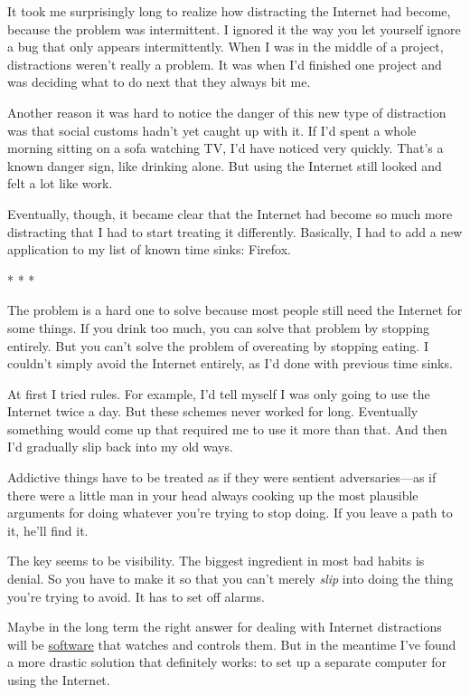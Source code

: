 It took me surprisingly long to realize how distracting the Internet had
become, because the problem was intermittent. I ignored it the way you
let yourself ignore a bug that only appears intermittently. When I was
in the middle of a project, distractions weren't really a problem. It
was when I'd finished one project and was deciding what to do next that
they always bit me.

Another reason it was hard to notice the danger of this new type of
distraction was that social customs hadn't yet caught up with it. If I'd
spent a whole morning sitting on a sofa watching TV, I'd have noticed
very quickly. That's a known danger sign, like drinking alone. But using
the Internet still looked and felt a lot like work.

Eventually, though, it became clear that the Internet had become so much
more distracting that I had to start treating it differently. Basically,
I had to add a new application to my list of known time sinks: Firefox.

* * *

The problem is a hard one to solve because most people still need the
Internet for some things. If you drink too much, you can solve that
problem by stopping entirely. But you can't solve the problem of
overeating by stopping eating. I couldn't simply avoid the Internet
entirely, as I'd done with previous time sinks.

At first I tried rules. For example, I'd tell myself I was only going to
use the Internet twice a day. But these schemes never worked for long.
Eventually something would come up that required me to use it more than
that. And then I'd gradually slip back into my old ways.

Addictive things have to be treated as if they were sentient
adversaries---as if there were a little man in your head always cooking
up the most plausible arguments for doing whatever you're trying to stop
doing. If you leave a path to it, he'll find it.

The key seems to be visibility. The biggest ingredient in most bad
habits is denial. So you have to make it so that you can't merely
\emph{slip} into doing the thing you're trying to avoid. It has to set
off alarms.

Maybe in the long term the right answer for dealing with Internet
distractions will be \href{http://rescuetime.com}{software} that watches
and controls them. But in the meantime I've found a more drastic
solution that definitely works: to set up a separate computer for using
the Internet.

